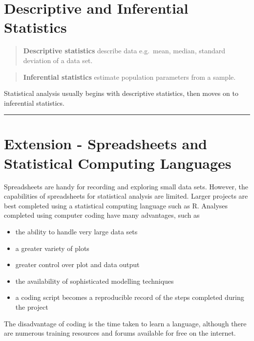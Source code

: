 \documentclass[
]{book}
\providecommand{\tightlist}{%
  \setlength{\itemsep}{0pt}\setlength{\parskip}{0pt}}
\begin{document}
\section{Descriptive and Inferential Statistics}\label{descriptive-and-inferential-statistics}

\begin{quote}
\textbf{Descriptive statistics} describe data e.g.~mean, median, standard deviation of a data set.
\end{quote}

\begin{quote}
\textbf{Inferential statistics} estimate population parameters from a sample.
\end{quote}

Statistical analysis usually begins with descriptive statistics, then moves on to inferential statistics.

\begin{center}\rule{0.5\linewidth}{0.5pt}\end{center}

\section{Extension - Spreadsheets and Statistical Computing Languages}\label{extension---spreadsheets-and-statistical-computing-languages}

Spreadsheets are handy for recording and exploring small data sets. However, the capabilities of spreadsheets for statistical analysis are limited. Larger projects are best completed using a statistical computing language such as R. Analyses completed using computer coding have many advantages, such as

\begin{itemize}
\tightlist
\item
  the ability to handle very large data sets
\item
  a greater variety of plots
\item
  greater control over plot and data output
\item
  the availability of sophisticated modelling techniques
\item
  a coding script becomes a reproducible record of the steps completed during the project
\end{itemize}

The disadvantage of coding is the time taken to learn a language, although there are numerous training resources and forums available for free on the internet.
\end{document}
